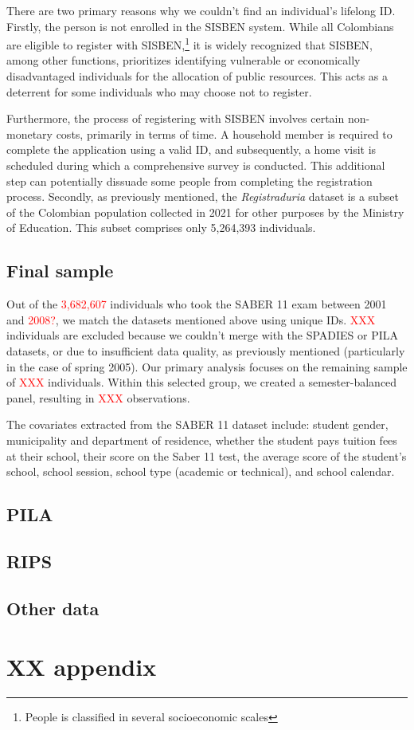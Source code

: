 \documentclass[12pt, a4paper]{article}
\begin{document}
There are two primary reasons why we couldn't find an individual's lifelong ID.
Firstly, the person is not enrolled in the SISBEN system. While all Colombians are eligible to register with SISBEN,\footnote{People is classified in several socioeconomic scales} it is widely recognized that SISBEN, among other functions, prioritizes identifying vulnerable or economically disadvantaged individuals for the allocation of public resources. This acts as a deterrent for some individuals who may choose not to register.

Furthermore, the process of registering with SISBEN involves certain non-monetary costs, primarily in terms of time. A household member is required to complete the application using a valid ID, and subsequently, a home visit is scheduled during which a comprehensive survey is conducted. This additional step can potentially dissuade some people from completing the registration process. Secondly, as previously mentioned, the \textit{Registraduria} dataset is a subset of the Colombian population collected in 2021 for other purposes by the Ministry of Education. This subset comprises only 5,264,393 individuals.



\subsection{Final sample}
Out of the \textcolor{red}{3,682,607} individuals who took the SABER 11 exam between 2001 and \textcolor{red}{2008?}, we match the datasets mentioned above using unique IDs. \textcolor{red}{XXX} individuals are excluded because we couldn't merge with the SPADIES or PILA datasets, or due to insufficient data quality, as previously mentioned (particularly in the case of spring 2005). Our primary analysis focuses on the remaining sample of \textcolor{red}{XXX} individuals. Within this selected group, we created a semester-balanced panel, resulting in \textcolor{red}{XXX} observations.

The covariates extracted from the SABER 11 dataset include: student gender, municipality and department of residence, whether the student pays tuition fees at their school, their score on the Saber 11 test, the average score of the student's school, school session, school type (academic or technical), and school calendar.


\subsection{PILA}


\subsection{RIPS}



\subsection{Other data}




\section{XX appendix}
\end{document}
